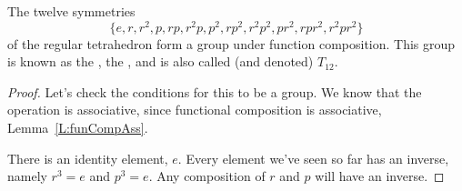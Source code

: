 \documentclass{ximera}
\begin{document}
\begin{example}
  The twelve symmetries
  \[
  \{e,r,r^2,p,rp,r^2p,p^2,rp^2,r^2p^2,pr^2,rpr^2,r^2pr^2\}
  \]
  of the regular tetrahedron form a group under function
  composition. This group is known as the , the
  , and is also called (and
  denoted) $T_{12}$.
  \begin{proof}
    Let's check the conditions for this to be a group. We know that
    the operation is associative, since functional composition is
    associative, Lemma~\ref{L:funCompAss}.

    There is an identity element, $e$. Every element we've seen so far
    has an inverse, namely $r^3 = e$ and $p^3= e$. Any composition of
    $r$ and $p$ will have an inverse.
    

\end{proof}
\end{example}
\end{document}
